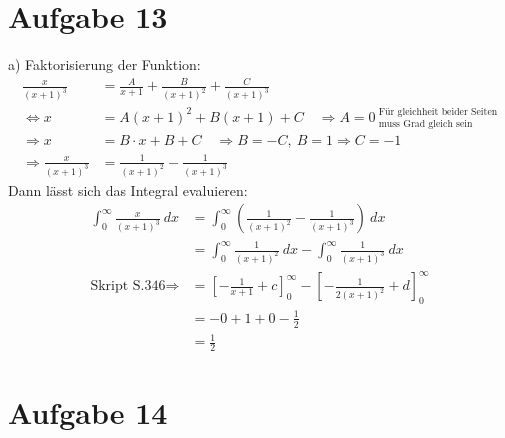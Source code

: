 \documentclass[10pt]{article}
\begin{document}
\thispagestyle{fancy}
\section*{Aufgabe 13}
a)
Faktorisierung der Funktion:
\begin{align*}
	\frac{x}{(x+1)^3} &=
	\frac{A}{x+1} + \frac{B}{(x+1)^2} + \frac{C}{(x+1)^3} \\
	\Leftrightarrow
	x &= 
	A (x+1)^2 + B (x+1) + C 
	\quad \Rightarrow
	A=0 \ 
	^\text{Für gleichheit beider Seiten}
	_\text{muss Grad gleich sein} \\
	\Rightarrow x &=
	B \cdot x + B + C
	\quad \Rightarrow B = -C, \ B = 1 \Rightarrow C = -1 \\
	\Rightarrow
	\frac{x}{(x+1)^3} &=
	\frac{1}{(x+1)^2} - \frac{1}{(x+1)^3}
\end{align*}
Dann lässt sich das Integral evaluieren:
\begin{align*}
	\int_0^\infty \frac{x}{(x+1)^3} \ dx
	&= 
	\int_0^\infty \left( 
	\frac{1}{(x+1)^2} - \frac{1}{(x+1)^3}
	\right)
	\ dx \\
	&= 
	\int_0^\infty \frac{1}{(x+1)^2} \ dx -
	\int_0^\infty \frac{1}{(x+1)^3} \ dx \\
	\text{Skript S.346} \Rightarrow
	&=
	\left[ -\frac{1}{x+1} + c\right]_0^\infty
	-
	\left[ -\frac1{2 (x+1)^2} + d \right]_0^\infty \\
	&= -0 + 1 + 0 - \frac12 \\
	&= \frac12
\end{align*}



\newpage
\setlength{\headheight}{0cm}

\section*{Aufgabe 14}
\end{document}
